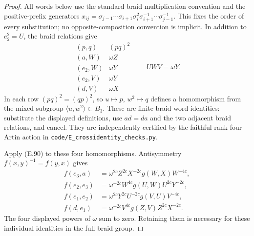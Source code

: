 \begin{proof}
All words below use the standard braid multiplication
convention and the positive-prefix generators
$x_{ij}=\sigma_{j-1}\cdots\sigma_{i+1}
\sigma_i^2\sigma_{i+1}^{-1}\cdots\sigma_{j-1}^{-1}$.
This fixes the order of every substitution; no
opposite-composition convention is implicit.
In addition to $e_2^2=U$, the braid relations give
\[
 \begin{array}{c|c}
 (p,q)&(pq)^2\\\hline
 (a,W)&\omega Z\\
 (e_2,W)&\omega Y\\
 (e_2,V)&\omega Y\\
 (d,V)&\omega X
 \end{array}
 \qquad UWV=\omega Y.                                \tag{E.94}
\]
In each row $(pq)^2=(qp)^2$, so $u\mapsto p$,
$w^2\mapsto q$ defines a homomorphism from the
mixed subgroup $\langle u,w^2\rangle\subset B_3$.
These are finite braid-word identities: substitute
the displayed definitions, use $ad=da$ and the
two adjacent braid relations, and cancel.  They
are independently certified by the faithful
rank-four Artin action in
\texttt{code/E\_crossidentity\_checks.py}.

Apply (E.90) to these four homomorphisms.
Antisymmetry $f(x,y)^{-1}=f(y,x)$ gives
\[
\begin{aligned}
 f(e_3,a)&=\omega^{2c}Z^{2c}X^{-2c}
                    g(W,X)W^{-4c},\\
 f(e_2,e_3)&=\omega^{-2c}W^{4c}
                    g(U,W)U^{2c}Y^{-2c},\\
 f(e_1,e_2)&=\omega^{2c}Y^{2c}U^{-2c}
                    g(V,U)V^{-4c},\\
 f(d,e_1)&=\omega^{-2c}V^{4c}
                    g(Z,V)Z^{2c}X^{-2c}.              
\end{aligned}\tag{E.95}
\]
The four displayed powers of $\omega$ sum to zero.
Retaining them is necessary for these individual
identities in the full braid group.


\end{proof}
